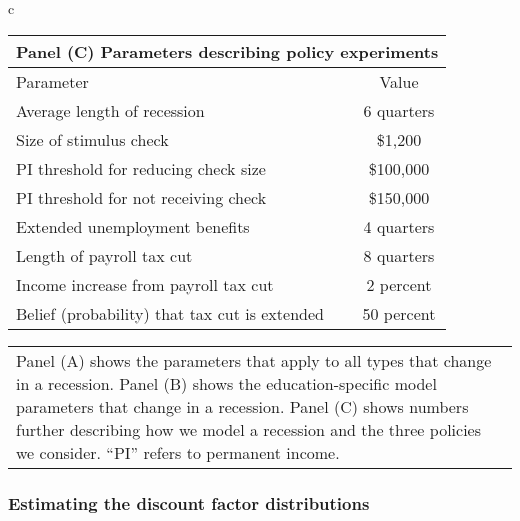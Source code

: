 \documentclass[\econtexRoot/HAFiscal]{subfiles}
\begin{document}
\begin{table}[p]
\begin{tabular}{c}
			\begin{tabular}{lc}
				\toprule 
				\multicolumn{2}{l}{Panel (C) Parameters describing policy experiments} \\ \midrule 
				Parameter & Value \\ \midrule 
				Average length of recession & 6 quarters \\ 
				Size of stimulus check & \$1,200 \\ 
				PI threshold for reducing check size & \$100,000 \\ 
				PI threshold for not receiving check & \$150,000 \\ 
				Extended unemployment benefits & 4 quarters \\
				Length of payroll tax cut & 8 quarters \\ 
				Income increase from payroll tax cut & 2 percent \\ 
				Belief (probability) that tax cut is extended & 50 percent 		
				\\ \bottomrule
			\end{tabular} 
			
		\end{tabular}
	\begin{tabular}{p{16cm}}
			\medskip
			\small Panel (A) shows the parameters that apply to all types that change in a recession. Panel (B) shows the education-specific model parameters that change in a recession. Panel (C) shows numbers further describing how we model a recession and the three policies we consider. ``PI'' refers to permanent income.
	\end{tabular}
	\notinsubfile{\label{tab:calibrationRecession}}
\end{table}




\hypertarget{estimating-the-discount-factor-distributions}{}\par\subsubsection{Estimating the discount factor distributions} 
\notinsubfile{\label{sec:estimBetas}}
\end{document}
